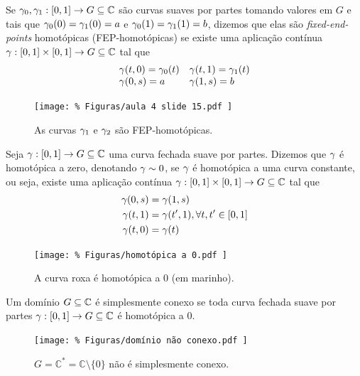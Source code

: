     \begin{definicao}
    \label{def-fep-homotopicas}
        Se $\gamma_0, \gamma_1 :[0,1]\to G\subseteq\mathbb{C}$ são curvas 
        suaves por partes tomando valores em $G$ e tais que 
        $\gamma_0(0) = \gamma_1(0) = a$ e $\gamma_0(1) = \gamma_1(1) = b$, 
        dizemos que elas são \textit{fixed-end-points}
        homotópicas (FEP-homotópicas) se existe uma aplicação contínua 
        $\gamma:[0,1]\times [0,1] \to G\subseteq\mathbb{C}$ tal que
        $$
          \begin{array}{ll}
            \gamma(t,0) = \gamma_0(t) & \gamma(t,1) = \gamma_1(t) \\
            \gamma(0,s) = a       & \gamma(1,s) = b
          \end{array}
        $$
        \begin{figure}[H]\centering
            \texttt{[image: \%
                Figuras/aula 4 slide 15.pdf
            ]}
            \caption{%
                As curvas $\gamma_1$ e $\gamma_2$ são FEP-homotópicas.
            }
        \end{figure}
    \end{definicao}
    \begin{definicao}
    \label{def-homotopica-a-zero}
        Seja $\gamma:[0,1]\to G\subseteq\mathbb{C}$ uma curva fechada suave por partes.
        Dizemos que $\gamma$ é homotópica a zero, denotando $\gamma\sim 0$, se $\gamma$
        é homotópica a uma curva constante, ou seja, existe uma aplicação contínua 
        $\gamma:[0,1]\times [0,1] \to G\subseteq\mathbb{C}$ tal que
        \begin{align*}
            \gamma(0,s) &= \gamma(1,s) \\
            \gamma(t,1) &= \gamma(t',1), \forall t, t'\in [0,1] \\
            \gamma(t,0) &= \gamma(t)
        \end{align*}
        \begin{figure}[H]\centering
            \texttt{[image: \%
                Figuras/homotópica a 0.pdf
            ]}
            \caption{%
                A curva roxa é homotópica a 0 (em marinho).
            }
        \end{figure}
    \end{definicao}

    \begin{definicao}
    \label{def-simplesmente-conexo}
        Um domínio $G\subseteq\mathbb{C}$ é simplesmente conexo se toda curva fechada
        suave por partes $\gamma: [0,1]\to G\subseteq\mathbb{C}$ é homotópica a 0.
        \begin{figure}[H]\centering
            \texttt{[image: \%
                Figuras/domínio não conexo.pdf
            ]}
            \caption{%
                $G = \mathbb{C}^*
			       = \mathbb{C}\setminus\{0\}$ 
			    não é simplesmente conexo.
			}
        \end{figure}
    \end{definicao}

